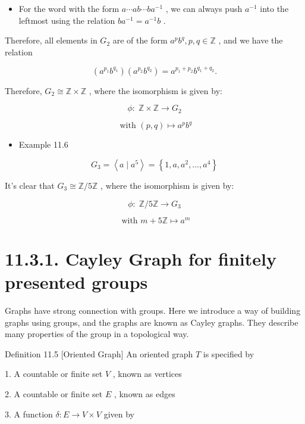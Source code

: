 \begin{itemize}
\item For the word with the form \(a\cdots {ab}\cdots b{a}^{-1}\) , we can always push \({a}^{-1}\) into the leftmost using the relation \(b{a}^{-1} = {a}^{-1}b\) .
\end{itemize}

Therefore, all elements in \({G}_{2}\) are of the form \({a}^{p}{b}^{q},p,q \in  \mathbb{Z}\) , and we have the relation

\[
\left( {{a}^{{p}_{1}}{b}^{{q}_{1}}}\right) \left( {{a}^{{p}_{2}}{b}^{{q}_{2}}}\right)  = {a}^{{p}_{1} + {p}_{2}}{b}^{{q}_{1} + {q}_{2}}.
\]

Therefore, \({G}_{2} \cong  \mathbb{Z} \times  \mathbb{Z}\) , where the isomorphism is given by:

\[
\phi  : \;\mathbb{Z} \times  \mathbb{Z} \rightarrow  {G}_{2}
\]

\[
\text{ with }\left( {p,q}\right)  \mapsto  {a}^{p}{b}^{q}
\]

\begin{itemize}
\item Example 11.6
\end{itemize}

\[
{G}_{3} = \left\langle  {a \mid  {a}^{5}}\right\rangle   = \left\{  {1,a,{a}^{2},\ldots ,{a}^{4}}\right\}
\]

It’s clear that \({G}_{3} \cong  \mathbb{Z}/5\mathbb{Z}\) , where the isomorphism is given by:

\[
\phi  : \;\mathbb{Z}/5\mathbb{Z} \rightarrow  {G}_{3}
\]

\[
\text{ with }m + 5\mathbb{Z} \mapsto  {a}^{m}
\]

\section*{11.3.1. Cayley Graph for finitely presented groups}

Graphs have strong connection with groups. Here we introduce a way of building graphs using groups, and the graphs are known as Cayley graphs. They describe many properties of the group in a topological way.

Definition 11.5 [Oriented Graph] An oriented graph \(T\) is specified by

1. A countable or finite set \(V\) , known as vertices

2. A countable or finite set \(E\) , known as edges

3. A function \(\delta  : E \rightarrow  V \times  V\) given by

